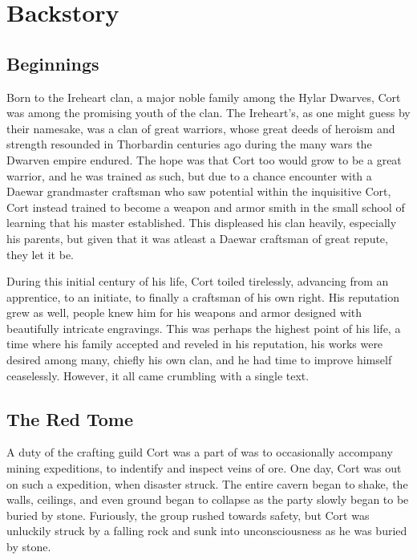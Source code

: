 \documentclass[12pt]{article}
\begin{document}
\section{Backstory}

\subsection{Beginnings}

Born to the Ireheart clan, a major noble family among the Hylar Dwarves, Cort
was among the promising youth of the clan. The Ireheart's, as one might guess by
their namesake, was a clan of great warriors, whose great deeds of heroism and
strength resounded in Thorbardin centuries ago during the many wars the Dwarven
empire endured. The hope was that Cort too would grow to be a great warrior, and
he was trained as such, but due to a chance encounter with a Daewar grandmaster
craftsman who saw potential within the inquisitive Cort, Cort instead trained to
become a weapon and armor smith in the small school of learning that his master
established. This displeased his clan heavily, especially his parents, but
given that it was atleast a Daewar craftsman of great repute, they let it be.

During this initial century of his life, Cort toiled tirelessly, advancing from
an apprentice, to an initiate, to finally a craftsman of his own right. His
reputation grew as well, people knew him for his weapons and armor designed with
beautifully intricate engravings. This was perhaps the highest point of his
life, a time where his family accepted and reveled in his reputation, his works
were desired among many, chiefly his own clan, and he had time to improve
himself ceaselessly. However, it all came crumbling with a single text.

\subsection{The Red Tome}

A duty of the crafting guild Cort was a part of was to occasionally accompany
mining expeditions, to indentify and inspect veins of ore. One day, Cort was out
on such a expedition, when disaster struck. The entire cavern began to shake,
the walls, ceilings, and even ground began to collapse as the party slowly began
to be buried by stone. Furiously, the group rushed towards safety, but Cort
was unluckily struck by a falling rock and sunk into unconsciousness as he was
buried by stone.
\end{document}
